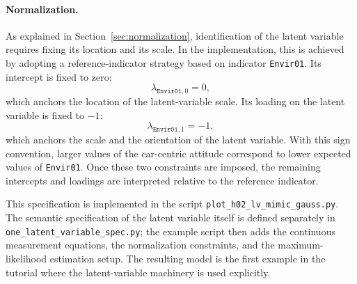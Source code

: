 \documentclass[12pt,a4paper]{article}
\let\OrigUnderscore\_
\def\_{\OrigUnderscore\penalty0\hspace{0pt}}%
\begin{document}
\paragraph{Normalization.}
As explained in Section~\ref{sec:normalization}, identification of the
latent variable requires fixing its location and its scale. In the
implementation, this is achieved by adopting a reference-indicator
strategy based on indicator \texttt{Envir01}. Its intercept is fixed
to zero:
\begin{equation}
  \lambda_{\texttt{Envir01},0}=0,
\end{equation}
which anchors the location of the latent-variable scale. Its loading
on the latent variable is fixed to \(-1\):
\begin{equation}
  \lambda_{\texttt{Envir01},1}=-1,
\end{equation}
which anchors the scale and the orientation of the latent variable.
With this sign convention, larger values of the car-centric attitude
correspond to lower expected values of \texttt{Envir01}. Once these
two constraints are imposed, the remaining intercepts and loadings are
interpreted relative to the reference indicator.

This specification is implemented in the script
\texttt{plot\_h02\_lv\_mimic\_gauss.py}. The semantic specification of
the latent variable itself is defined separately in
\texttt{one\_latent\_variable\_spec.py}; the example script then adds
the continuous measurement equations, the normalization constraints,
and the maximum-likelihood estimation setup. The resulting model is
the first example in the tutorial where the latent-variable machinery
is used explicitly.
\end{document}
